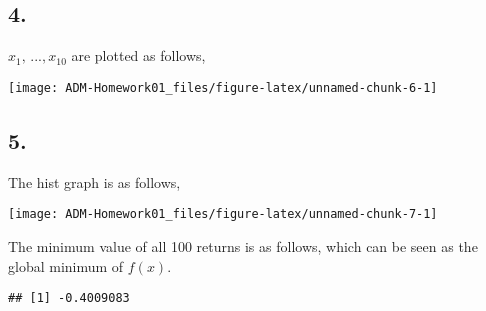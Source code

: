 \documentclass[]{article}
\begin{document}
\subsection{4.}\label{section-9}

\(x_1,\,...,x_{10}\) are plotted as follows,

\begin{center}\texttt{[image: ADM-Homework01\_files/figure-latex/unnamed-chunk-6-1]} \end{center}

\subsection{5.}\label{section-10}

The hist graph is as follows,

\begin{center}\texttt{[image: ADM-Homework01\_files/figure-latex/unnamed-chunk-7-1]} \end{center}

The minimum value of all 100 returns is as follows, which can be seen as
the global minimum of \(f(x)\).

\begin{verbatim}
## [1] -0.4009083
\end{verbatim}
\end{document}
